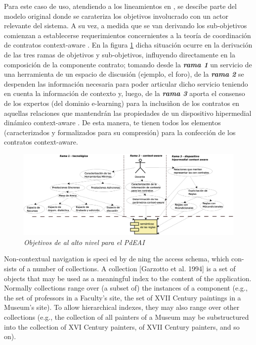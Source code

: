 \documentclass{llncs}
\begin{document}
Para este caso de uso, atendiendo a los lineamientos en \cite{libro7}, se descibe parte del modelo original donde se carateriza los objetivos involucrado con un actor relevante del sistema. A su vez, a medida que se van derivando los sub-objetivos comienzan a establecerse requerimientos concernientes a la teoría de coordinación de contratos context-aware \cite{libro5,contratos}. En la figura \ref{requerimientos} dicha situación ocurre en la derivación de las tres ramas de objetivos y sub-objetivos, influyendo directamente en la composición de la componente contrato; tomando desde la \textit{\textbf{rama 1}} un servicio de una herramienta de un espacio de discusión (ejemplo, el foro), de la \textit{\textbf{rama 2}} se despenden las información necesaria para poder articular dicho servicio teniendo en cuenta la información de contexto y, luego, de la \textit{\textbf{rama 3}} aporta el consenso de los expertos (del dominio e-learning) para la inclusiñon de los contratos en aquellas relaciones que mantendrán las propiedades de un dispositivo hipermedial dinámico context-aware \cite{libro5}. De esta manera, te tienen todos los elementos (caracterizados y formalizados para su compresión) para la confección de los contratos context-aware.


	\begin{figure}[!h]
        	\begin{center}
		\includegraphics[width= 6 in,totalheight=3 in]{Requerimientos.eps}
                \caption{\small \sl Objetivos de al alto nivel  para el PdEAI} \label{requerimientos}
         	\end{center}
         \end{figure}


Non-contextual navigation is specied by dening the access schema, which con-
sists of a number of collections.
A collection [Garzotto et al. 1994] is a set of objects that may be used as a
meaningful index to the content of the application. Normally collections range over
(a subset of) the instances of a component (e.g., the set of professors in a Faculty's
site, the set of XVII Century paintings in a Museum's site). To allow hierarchical
indexes, they may also range over other collections (e.g., the collection of all painters
of a Museum may be substructured into the collection of XVI Century painters, of
XVII Century painters, and so on).
\end{document}
